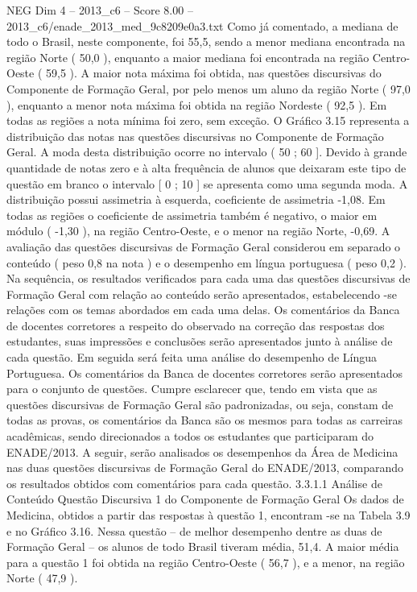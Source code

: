 \begin{textsample}{NEG Dim 4 – 2013\_c6 – Score 8.00 – 2013\_c6/enade\_2013\_med\_9c8209e0a3.txt}
Como já comentado, a mediana de todo o Brasil, neste componente, foi 55,5, sendo a menor mediana encontrada na região Norte ( 50,0 ), enquanto a maior mediana foi encontrada na região Centro-Oeste ( 59,5 ).
A maior nota máxima foi obtida, nas questões discursivas do Componente de Formação Geral, por pelo menos um aluno da região Norte ( 97,0 ), enquanto a menor nota máxima foi obtida na região Nordeste ( 92,5 ).
Em todas as regiões a nota mínima foi zero, sem exceção.
O Gráfico 3.15 representa a distribuição das notas nas questões discursivas no Componente de Formação Geral.
A moda desta distribuição ocorre no intervalo ( 50 ; 60 ].
Devido à grande quantidade de notas zero e à alta frequência de alunos que deixaram este tipo de questão em branco o intervalo [ 0 ; 10 ] se apresenta como uma segunda moda.
A distribuição possui assimetria à esquerda, coeficiente de assimetria -1,08.
Em todas as regiões o coeficiente de assimetria também é negativo, o maior em módulo ( -1,30 ), na região Centro-Oeste, e o menor na região Norte, -0,69.
A avaliação das questões discursivas de Formação Geral considerou em separado o conteúdo ( peso 0,8 na nota ) e o desempenho em língua portuguesa ( peso 0,2 ).
Na sequência, os resultados verificados para cada uma das questões discursivas de Formação Geral com relação ao conteúdo serão apresentados, estabelecendo -se relações com os temas abordados em cada uma delas.
Os comentários da Banca de docentes corretores a respeito do observado na correção das respostas dos estudantes, suas impressões e conclusões serão apresentados junto à análise de cada questão.
Em seguida será feita uma análise do desempenho de Língua Portuguesa.
Os comentários da Banca de docentes corretores serão apresentados para o conjunto de questões.
Cumpre esclarecer que, tendo em vista que as questões discursivas de Formação Geral são padronizadas, ou seja, constam de todas as provas, os comentários da Banca são os mesmos para todas as carreiras acadêmicas, sendo direcionados a todos os estudantes que participaram do ENADE/2013.
A seguir, serão analisados os desempenhos da Área de Medicina nas duas questões discursivas de Formação Geral do ENADE/2013, comparando os resultados obtidos com comentários para cada questão. 3.3.1.1 Análise de Conteúdo Questão Discursiva 1 do Componente de Formação Geral Os dados de Medicina, obtidos a partir das respostas à questão 1, encontram -se na Tabela 3.9 e no Gráfico 3.16.
Nessa questão – de melhor desempenho dentre as duas de Formação Geral – os alunos de todo Brasil tiveram média, 51,4.
A maior média para a questão 1 foi obtida na região Centro-Oeste ( 56,7 ), e a menor, na região Norte ( 47,9 ).

\end{textsample}
